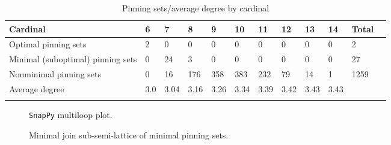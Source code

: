 \documentclass{article}%
\begin{document}
\begin{table}[ht]
	\caption{Pinning sets/average degree by cardinal}
	\centering
	\renewcommand{\arraystretch}{1.5}
	\begin{tabularx}{\textwidth}{lXXXXXXXXXXX}
		\toprule
			Cardinal & 6 & 7 & 8 & 9 & 10 & 11 & 12 & 13 & 14 & Total\\
			\hline
			Optimal pinning sets & 2 & 0 & 0 & 0 & 0 & 0 & 0 & 0 & 0 & 2 \\
			Minimal (suboptimal) pinning sets & 0 & 24 & 3 & 0 & 0 & 0 & 0 & 0 & 0 & 27 \\
			Nonminimal pinning sets & 0 & 16 & 176 & 358 & 383 & 232 & 79 & 14 & 1 & 1259 \\
			Average degree & 3.0 & 3.04 & 3.16 & 3.26 & 3.34 & 3.39 & 3.42 & 3.43 & 3.43 &  \\
		\bottomrule \\ 
	\end{tabularx}
\end{table}

\begin{multicols}{2}
\begin{figure}[H]
\centering

\caption{\texttt{SnapPy} multiloop plot.}
\label{fig:tex/img/[[8, 16, 1, 9], [9, 17, 10, 24], [7, 23, 8, 24], [15, 22, 16, 23], [1, 22, 2, 21], [17, 5, 18, 6], [10, 6, 11, 7], [14, 2, 15, 3], [20, 13, 21, 14], [4, 12, 5, 13], [18, 12, 19, 11], [3, 19, 4, 20]].svg}
\end{figure}
\columnbreak

\begin{figure}[H]
\centering
\scalebox{0.8}{}
\caption{Minimal join sub-semi-lattice of minimal pinning sets.}
\label{fig:tex/img/[[8, 16, 1, 9], [9, 17, 10, 24], [7, 23, 8, 24], [15, 22, 16, 23], [1, 22, 2, 21], [17, 5, 18, 6], [10, 6, 11, 7], [14, 2, 15, 3], [20, 13, 21, 14], [4, 12, 5, 13], [18, 12, 19, 11], [3, 19, 4, 20]].pgf}
\end{figure}
\end{multicols}

\newpage
\end{document}
